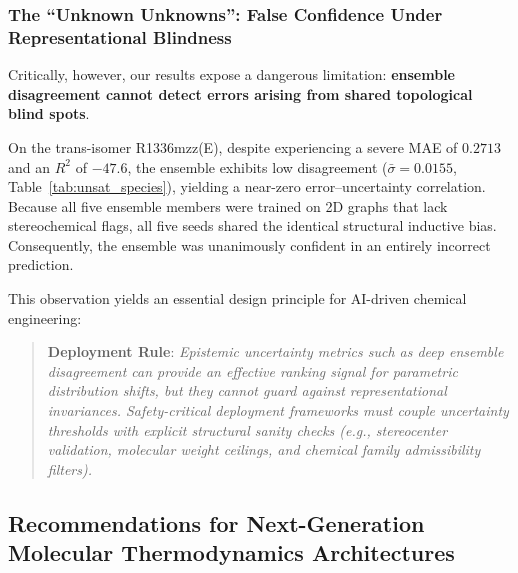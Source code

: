 \subsubsection{The ``Unknown Unknowns'': False Confidence Under Representational Blindness}
Critically, however, our results expose a dangerous limitation: \textbf{ensemble disagreement cannot detect errors arising from shared topological blind spots}.

On the trans-isomer R1336mzz(E), despite experiencing a severe MAE of $0.2713$ and an $R^2$ of $-47.6$, the ensemble exhibits low disagreement ($\bar{\sigma} = 0.0155$, Table~\ref{tab:unsat_species}), yielding a near-zero error--uncertainty correlation. Because all five ensemble members were trained on 2D graphs that lack stereochemical flags, all five seeds shared the identical structural inductive bias. Consequently, the ensemble was unanimously confident in an entirely incorrect prediction.

This observation yields an essential design principle for AI-driven chemical engineering:
\begin{quote}
\textbf{Deployment Rule}: \textit{Epistemic uncertainty metrics such as deep ensemble disagreement can provide an effective ranking signal for parametric distribution shifts, but they cannot guard against representational invariances. Safety-critical deployment frameworks must couple uncertainty thresholds with explicit structural sanity checks (e.g., stereocenter validation, molecular weight ceilings, and chemical family admissibility filters).}
\end{quote}

\subsection{Recommendations for Next-Generation Molecular Thermodynamics Architectures}
\label{subsec:recommendations}

